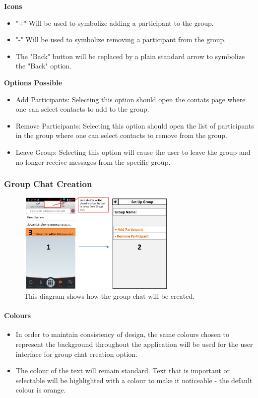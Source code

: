 \documentclass[11pt]{article}
\begin{document}
\textbf{Icons}\\
\begin{itemize}
\item	"+" Will be used to symbolize adding a participant to the group.  
\item "-" Will be used to symbolize removing a participant from the group.
\item The "Back" button will be replaced by a plain standard arrow to symbolize the "Back" option.  
\end{itemize}

\textbf{Options Possible}\\
\begin{itemize}
\item	Add Participants: Selecting this option should open the contats page where one can select contacts to add to the group.
\item 	Remove Participants: Selecting this option should open the list of participants in the group where one can select contacts to remove from the group.
\item Leave Group: Selecting this option will cause the user to leave the group and no longer receive messages from the specific group.\\
\end{itemize}


\newpage

\subsubsection{Group Chat Creation}
\begin{figure}[H]
\centering
\includegraphics[width=3in]{CG.jpg}
\caption[Create Group Chat]{This diagram shows how the group chat will be created.}
\label{cd-cg}
\end{figure}

\paragraph{Colours}
\begin{itemize}
\item	In order to maintain consistency of design, the same colours chosen to represent the background throughout the application will be used for the user interface for group chat creation option.
\item	The colour of the text will remain standard. Text that is important or selectable will be highlighted with a colour to make it noticeable - the default colour is orange. 	\\
\end{itemize}
\end{document}
